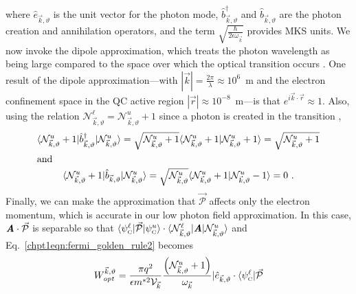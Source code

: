 {where $\hat{e}_{\vec{k},\vartheta}$ is the unit vector for the photon mode, $\hat{b}^\dagger_{\vec{k},\vartheta}$ and $\hat{b}_{\vec{k},\vartheta}$ are the photon creation and annihilation operators, and the term $\sqrt{\frac{\hslash}{2 \epsilon \omega_{\vec{k}}}}$ provides MKS units.  We now invoke the dipole approximation, which treats the photon wavelength as being large compared to the space over which the optical transition occurs \cite{Parker:book:2005}. One result of the dipole approximation---with $|\vec{k}|=\frac{2\pi}{\lambda}\approx10^6$~m and the electron confinement space in the QC active region $|\vec{r}|\approx10^{-8}$~m---is that $e^{i \vec{k} \cdot \vec{r}}\approx1$.  Also, using the relation $\mathcal{N}_{\vec{k},\vartheta}^\ell=\mathcal{N}_{\vec{k},\vartheta}^u+1$ since a photon is created in the transition ,
\begin{subequations}
\begin{gather}
\langle \mathcal{N}_{\vec{k},\vartheta}^u+1 | \hat{b}^\dagger_{\vec{k},\vartheta} | \mathcal{N}_{\vec{k},\vartheta}^u \rangle =  \sqrt{\mathcal{N}_{\vec{k},\vartheta}^u+1} \langle \mathcal{N}_{\vec{k},\vartheta}^u+1 | \mathcal{N}_{\vec{k},\vartheta}^u+1 \rangle = \sqrt{\mathcal{N}_{\vec{k},\vartheta}^u+1}\\
\intertext{and}
\langle \mathcal{N}_{\vec{k},\vartheta}^u+1 | \hat{b}_{\vec{k},\vartheta} | \mathcal{N}_{\vec{k},\vartheta}^u \rangle = \sqrt{\mathcal{N}_{\vec{k},\vartheta}^u} \langle \mathcal{N}_{\vec{k},\vartheta}^u+1 | \mathcal{N}_{\vec{k},\vartheta}^u-1 \rangle = 0 \textnormal{~.}
\end{gather}
\end{subequations}
Finally, we can make the approximation that $\vec{\mathcal{P}}$ affects only the electron momentum, which is accurate in our low photon field approximation.  In this case, $\textit{\textbf{A}} \cdot \vec{\mathcal{P}}$ is separable so that $\langle \psi_{\textnormal{\tiny{C}}}^\ell | \vec{\mathcal{P}} | \psi_{\textnormal{\tiny{C}}}^u \rangle \cdot \langle \mathcal{N}_{\vec{k},\vartheta}^\ell \vert \textit{\textbf{A}} \vert \mathcal{N}_{\vec{k},\vartheta}^u  \rangle$
and Eq.~\eqref{chpt1eqn:fermi_golden_rule2} becomes
\begin{equation}
\label{chpt1eqn:fermi_golden_rule3}
W_\textit{opt}^{\vec{k},\vartheta} = \frac{\pi q^2}{\epsilon m^{*2} \mathcal{V}_{\vec{k}}}
\frac{\left(\mathcal{N}_{\vec{k},\vartheta}^u+1\right)}{\omega_{\vec{k}}}
\vert \hat{e}_{\vec{k},\vartheta} \cdot \langle \psi_\tn{\tiny{C}}^\ell \vert \vec{\mathcal{P}}

\end{equation}}
